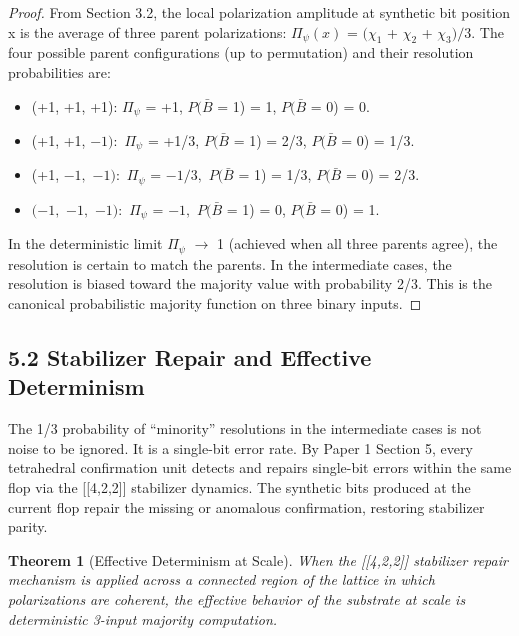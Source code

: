 \documentclass[11pt,oneside]{report}
\newtheorem{theorem}{Theorem}[section]
\theoremstyle{definition}
\theoremstyle{remark}
\begin{document}
\begin{proof}
From Section 3.2, the local polarization amplitude at synthetic
bit position x is the average of three parent polarizations: \ensuremath{\Pi_{\psi}(x)} =
\ensuremath{(\chi_{1}} + \ensuremath{\chi_{2}} + \ensuremath{\chi_{3})/3.} The four possible parent configurations (up to
permutation) and their resolution probabilities are:

\begin{itemize}
\item
  (+1, +1, +1): \ensuremath{\Pi_{\psi}} = +1, \ensuremath{P(\bar{B}} = 1) = 1, \ensuremath{P(\bar{B}} = 0) = 0.
\item
  (+1, +1, \ensuremath{-1):} \ensuremath{\Pi_{\psi}} = +1/3, \ensuremath{P(\bar{B}} = 1) = 2/3, \ensuremath{P(\bar{B}} = 0) = 1/3.
\item
  (+1, \ensuremath{-1,} \ensuremath{-1):} \ensuremath{\Pi_{\psi}} = \ensuremath{-1/3,} \ensuremath{P(\bar{B}} = 1) = 1/3, \ensuremath{P(\bar{B}} = 0) = 2/3.
\item
  \ensuremath{(-1,} \ensuremath{-1,} \ensuremath{-1):} \ensuremath{\Pi_{\psi}} = \ensuremath{-1,} \ensuremath{P(\bar{B}} = 1) = 0, \ensuremath{P(\bar{B}} = 0) = 1.
\end{itemize}

In the deterministic limit \textbar \ensuremath{\Pi_{\psi}}\textbar{} \ensuremath{\to} 1 (achieved when
all three parents agree), the resolution is certain to match the
parents. In the intermediate cases, the resolution is biased toward the
majority value with probability 2/3. This is the canonical probabilistic
majority function on three binary inputs.

\end{proof}

\subsection*{5.2 Stabilizer Repair and Effective Determinism}

The 1/3 probability of ``minority'' resolutions in the intermediate
cases is not noise to be ignored. It is a single-bit error rate. By
Paper 1 Section 5, every tetrahedral confirmation unit detects and
repairs single-bit errors within the same flop via the [[4,2,2]]
stabilizer dynamics. The synthetic bits produced at the current flop
repair the missing or anomalous confirmation, restoring stabilizer
parity.

\begin{theorem}[Effective Determinism at Scale]
When the [[4,2,2]]
stabilizer repair mechanism is applied across a connected region of the
lattice in which polarizations are coherent, the effective behavior of
the substrate at scale is deterministic 3-input majority computation.
\end{theorem}
\end{document}
